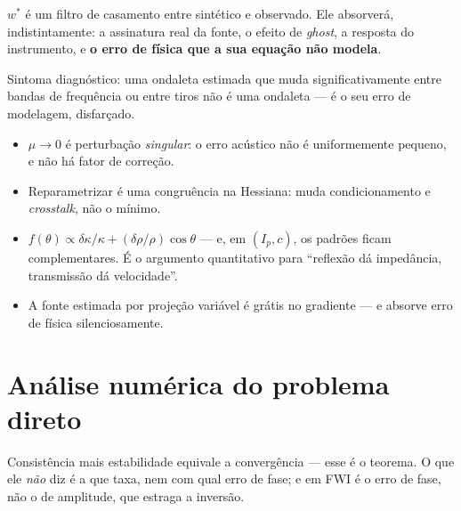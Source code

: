 \documentclass[11pt,a4paper,oneside]{report}
\begin{document}
\begin{armadilha}
$w^{*}$ \'e um filtro de casamento entre sint\'etico e observado. Ele
absorver\'a, indistintamente: a assinatura real da fonte, o efeito de
\emph{ghost}, a resposta do instrumento, e \textbf{o erro de f\'isica que a
sua equa\c{c}\~ao n\~ao modela}.

Sintoma diagn\'ostico: uma ondaleta estimada que muda significativamente entre
bandas de frequ\^encia ou entre tiros n\~ao \'e uma ondaleta --- \'e o seu erro
de modelagem, disfar\c{c}ado.
\end{armadilha}

\begin{resumo}
\begin{itemize}[leftmargin=*, itemsep=1pt]
\item $\mu \to 0$ \'e perturba\c{c}\~ao \emph{singular}: o erro ac\'ustico n\~ao
\'e uniformemente pequeno, e n\~ao h\'a fator de corre\c{c}\~ao.
\item Reparametrizar \'e uma congru\^encia na Hessiana: muda condicionamento e
\emph{crosstalk}, n\~ao o m\'inimo.
\item $f(\theta) \propto \delta\kappa/\kappa + (\delta\rho/\rho)\cos\theta$ ---
e, em $(I_p,c)$, os padr\~oes ficam complementares. \'E o argumento
quantitativo para ``reflex\~ao d\'a imped\^ancia, transmiss\~ao d\'a
velocidade''.
\item A fonte estimada por proje\c{c}\~ao vari\'avel \'e gr\'atis no
gradiente --- e absorve erro de f\'isica silenciosamente.
\end{itemize}
\end{resumo}

\chapter{An\'alise num\'erica do problema direto}
\label{cap:numerico}

\begin{ideia}
Consist\^encia mais estabilidade equivale a converg\^encia --- esse \'e o
teorema. O que ele \emph{n\~ao} diz \'e a que taxa, nem com qual erro de fase;
e em FWI \'e o erro de fase, n\~ao o de amplitude, que estraga a invers\~ao.
\end{ideia}
\end{document}
